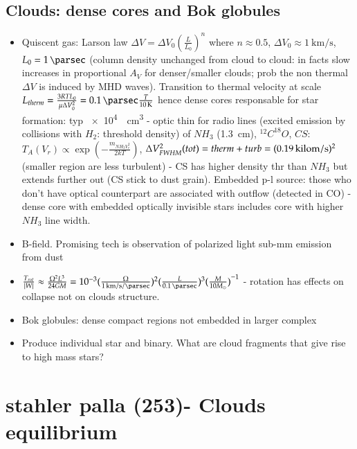 \section{Clouds: dense cores and Bok globules}
\begin{itemize}
\item Quiscent gas: Larson law $\Delta V=\Delta V_0(\frac{L}{L_0})^n$ where $n\approx0.5$, $\Delta V_0\approx\SI{1}{\kilo\meter\per\second}$, $L_0=\SI{1}{\parsec}$ (column density unchanged from cloud to cloud: in facts slow increases in proportional $A_V$ for denser/smaller clouds; prob the non thermal $\Delta V$ is induced by MHD waves). Transition to thermal velocity at scale $L_{therm}=\frac{3RTL_0}{\mu\Delta V_0^2}=\SI{0.1}{\parsec}\frac{T}{\SI{10}{\kelvin}}$ hence dense cores responsable for star formation: typ \SI{e4}{\per\cubic\cm} - optic thin for radio lines (excited emission by collisions with $H_2$: threshold density) of $NH_3$ (\SI{1.3}{\cm}), $^{12}C^{18}O$, $CS$: $T_A(V_r)\propto\exp{(-\frac{m_{NH_3V_r^2}}{2kT})}$, $\Delta V_{FWHM}^2(tot)=therm+turb=(\SI{0.19}{\\kilo\meter\per\second})^2$ (smaller region are less turbulent) - CS has higher density thr than $NH_3$ but extends further out (CS stick to dust grain). Embedded p-l source: those who don't have optical counterpart are associated with outflow (detected in CO) - dense core with embedded optically invisible stars includes core with higher $NH_3$ line width.
\item B-field. Promising tech is observation of polarized light sub-mm emission from dust
\item $\frac{T_{rot}}{|W|}\approx\frac{\Omega^2 L^3}{24GM}=\num{e-3}(\frac{\Omega}{\SI{1}{\kilo\meter\per\second\per\parsec}})^2(\frac{L}{\SI{0.1}{\parsec}})^3\invers{(\frac{M}{10\msun})}$ - rotation has effects on collapse not on clouds structure.
\item Bok globules: dense compact regions not embedded in larger complex
\item Produce individual star and binary. What are cloud fragments that give rise to high mass stars?
\end{itemize}

\chapter{stahler palla (253)- Clouds equilibrium}

